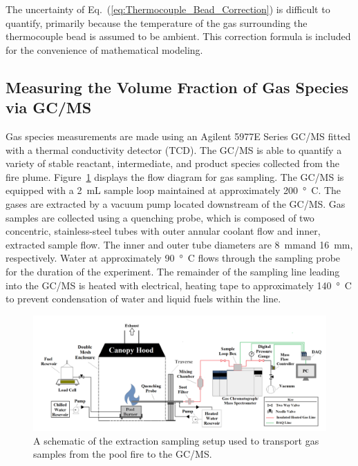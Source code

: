 \documentclass[12pt]{article}
\begin{document}
The uncertainty of Eq.~(\ref{eq:Thermocouple_Bead_Correction}) is difficult to quantify, primarily because the temperature of the gas surrounding the thermocouple bead is assumed to be ambient. This correction formula is included for the convenience of mathematical modeling.


\subsection{Measuring the Volume Fraction of Gas Species via GC/MS}
\label{ssec:Gas_Species_Setup}

Gas species measurements are made using an Agilent 5977E Series GC/MS fitted with a thermal conductivity detector (TCD). The GC/MS is able to quantify a variety of stable reactant, intermediate, and product species collected from the fire plume. Figure~\ref{fig:Experimental_Setup} displays the flow diagram for gas sampling. The GC/MS is equipped with a 2~mL sample loop maintained at approximately \SI{200}{\degree C}. The gases are extracted by a vacuum pump located downstream of the GC/MS. Gas samples are collected using a quenching probe, which is composed of two concentric, stainless-steel tubes with outer annular coolant flow and inner, extracted sample flow. The inner and outer tube diameters are \SI{8}{mm}and \SI{16}{mm}, respectively. Water at approximately \SI{90}{\degree C} flows through the sampling probe for the duration of the experiment. The remainder of the sampling line leading into the GC/MS is heated with electrical, heating tape to approximately \SI{140}{\degree C} to prevent condensation of water and liquid fuels within the line.

\begin{figure}
	\centering
\includegraphics[width=\textwidth,keepaspectratio]{Experimental_Setup.png}
	\caption[A schematic of the gas sampling procedure]{A schematic of the extraction sampling setup used to transport gas samples from the pool fire to the GC/MS.}
	\label{fig:Experimental_Setup}
\end{figure}
\end{document}
